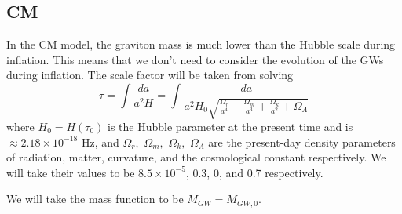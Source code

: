 \documentclass[prd,twocolumn,aps,psfig,nofootinbib,nobibnotes,superscriptaddress,preprintnumbers,times]{revtex4-2}
\begin{document}
\subsection{CM}
In the CM model, the graviton mass is much lower than the Hubble scale during inflation. This means that we don't need to consider the evolution of the GWs during inflation. The scale factor will be taken from solving
\begin{equation}
    \tau = \int \frac{da}{a^2H} = \int \frac{da}{a^2H_0\sqrt{\frac{\Omega_r}{a^4} + \frac{\Omega_m}{a^3}+ \frac{\Omega_k}{a^2}+\Omega_\Lambda}}
    \label{eqn:5}
\end{equation} where $H_0 = H(\tau_0) $ is the Hubble parameter at the present time and is $\approx 2.18\times 10^{-18}$ Hz, and $\Omega_r,$ $ \Omega_m,$ $ \Omega_k, $ $\Omega_\Lambda$ are the present-day density parameters of radiation, matter, curvature, and the cosmological constant respectively. We will take their values to be $8.5\times 10^{-5}$, 0.3, 0, and 0.7 respectively.

We will take the mass function to be $M_{GW} = M_{GW,0}$. 
\end{document}
